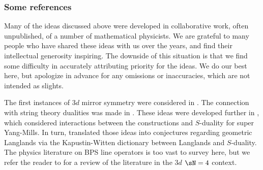 \subsubsection{Some references}\label{ss:3d-refs}

Many of the ideas discussed above were developed in
collaborative work, often unpublished, of a number of mathematical physicists.
We are grateful to many people who have shared these ideas
with us over the years, and find their intellectual generosity inspiring.
The downside of this situation is that we find some difficulty in accurately
attributing priority for the ideas. We do our best here, but apologize in
advance for any omissions or inaccuracies, which are not intended as slights.

The first instances of $3d$ mirror symmetry were considered in
\cite{intriligator-seiberg}. The connection with string theory dualities
was made in \cite{hanany-witten}. These ideas were developed further
in \cite{gaiotto-witten}, which considered interactions between the
\cite{hanany-witten} constructions and $S$-duality for super Yang-Mills.
In turn, \cite{gaiotto-s} translated those ideas into conjectures regarding
geometric Langlands via the Kapustin-Witten dictionary \cite{kapustin-witten}
between Langlands and $S$-duality. The physics literature on BPS line operators
is too vast to survey here, but we refer the reader to \cite{dggh} for a
review of the literature in the $3d$ $\sN = 4$ context.

